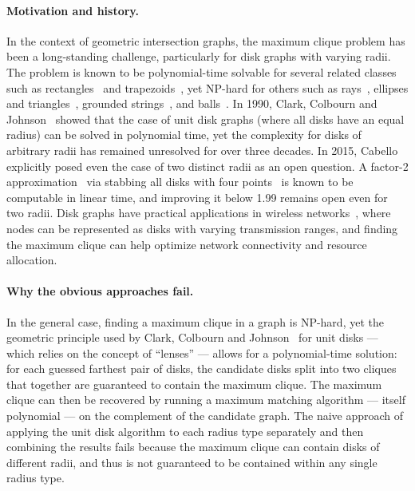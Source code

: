 \documentclass[12pt]{article}
\begin{document}
\paragraph{Motivation and history.}
In the context of geometric intersection graphs, the maximum clique problem has been a long-standing challenge, particularly for disk graphs with varying radii.
The problem is known to be polynomial-time solvable for several related classes such as rectangles~\cite{imai1983rectangles} and trapezoids~\cite{felsner1997trapezoid},
yet NP-hard for others such as rays~\cite{cabello2013rays}, ellipses and triangles~\cite{ambuhl2005ellipses}, grounded strings~\cite{keil2022strings}, and balls~\cite{bonamy2021jacm}.
In 1990, Clark, Colbourn and Johnson~\cite{clark1990udg} showed that the case of unit disk graphs (where all disks have an equal radius) can be solved in polynomial time,
yet the complexity for disks of arbitrary radii has remained unresolved for over three decades.
In 2015, Cabello~\cite{cabello2015open} explicitly posed even the case of two distinct radii as an open question.
A factor-2 approximation~\cite{ambuhl2005ellipses} via stabbing all disks with four points~\cite{danzer1986stabbing,carmi2023stabbing} is known to be computable in linear time, and improving it below 1.99 remains open even for two radii.
Disk graphs have practical applications in wireless networks~\cite{huson1995wireless}, where nodes can be represented as disks with varying transmission ranges, and finding the maximum clique can help optimize network connectivity and resource allocation.

\paragraph{Why the obvious approaches fail.}
In the general case, finding a maximum clique in a graph is NP-hard, yet the geometric principle used by Clark, Colbourn and Johnson~\cite{clark1990udg} for unit disks --- which relies on the concept of ``lenses'' ---
allows for a polynomial-time solution: for each guessed farthest pair of disks, the candidate disks split into two cliques that together are guaranteed to contain the maximum clique.
The maximum clique can then be recovered by running a maximum matching algorithm --- itself polynomial --- on the complement of the candidate graph.
The naive approach of applying the unit disk algorithm to each radius type separately and then combining the results fails because the maximum clique can contain disks of different radii, and thus is not guaranteed to be contained within any single radius type.
\end{document}
